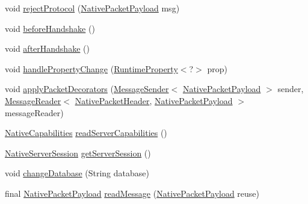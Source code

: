 \begin{DoxyCompactItemize}
\item 
void \mbox{\hyperlink{classcom_1_1mysql_1_1cj_1_1protocol_1_1a_1_1_native_protocol_a8283407fa3022adc16c70f9c62e8d9ca}{reject\+Protocol}} (\mbox{\hyperlink{classcom_1_1mysql_1_1cj_1_1protocol_1_1a_1_1_native_packet_payload}{Native\+Packet\+Payload}} msg)
\item 
void \mbox{\hyperlink{classcom_1_1mysql_1_1cj_1_1protocol_1_1a_1_1_native_protocol_a30895f4669b803d40bfc8dd8d3f1dd32}{before\+Handshake}} ()
\item 
void \mbox{\hyperlink{classcom_1_1mysql_1_1cj_1_1protocol_1_1a_1_1_native_protocol_a085d0d9db853b6e0ba5a88f52e19a3ed}{after\+Handshake}} ()
\item 
void \mbox{\hyperlink{classcom_1_1mysql_1_1cj_1_1protocol_1_1a_1_1_native_protocol_a8ca553b8932948c32622bb09d58df2f5}{handle\+Property\+Change}} (\mbox{\hyperlink{interfacecom_1_1mysql_1_1cj_1_1conf_1_1_runtime_property}{Runtime\+Property}}$<$?$>$ prop)
\item 
void \mbox{\hyperlink{classcom_1_1mysql_1_1cj_1_1protocol_1_1a_1_1_native_protocol_aebf9cad7c22da41d696066a75e768eed}{apply\+Packet\+Decorators}} (\mbox{\hyperlink{interfacecom_1_1mysql_1_1cj_1_1protocol_1_1_message_sender}{Message\+Sender}}$<$ \mbox{\hyperlink{classcom_1_1mysql_1_1cj_1_1protocol_1_1a_1_1_native_packet_payload}{Native\+Packet\+Payload}} $>$ sender, \mbox{\hyperlink{interfacecom_1_1mysql_1_1cj_1_1protocol_1_1_message_reader}{Message\+Reader}}$<$ \mbox{\hyperlink{classcom_1_1mysql_1_1cj_1_1protocol_1_1a_1_1_native_packet_header}{Native\+Packet\+Header}}, \mbox{\hyperlink{classcom_1_1mysql_1_1cj_1_1protocol_1_1a_1_1_native_packet_payload}{Native\+Packet\+Payload}} $>$ message\+Reader)
\item 
\mbox{\hyperlink{classcom_1_1mysql_1_1cj_1_1protocol_1_1a_1_1_native_capabilities}{Native\+Capabilities}} \mbox{\hyperlink{classcom_1_1mysql_1_1cj_1_1protocol_1_1a_1_1_native_protocol_acfce17a81631146efc0ca8d9cef22880}{read\+Server\+Capabilities}} ()
\item 
\mbox{\hyperlink{classcom_1_1mysql_1_1cj_1_1protocol_1_1a_1_1_native_server_session}{Native\+Server\+Session}} \mbox{\hyperlink{classcom_1_1mysql_1_1cj_1_1protocol_1_1a_1_1_native_protocol_a160dda876f487328e007c9c96b155c6b}{get\+Server\+Session}} ()
\item 
void \mbox{\hyperlink{classcom_1_1mysql_1_1cj_1_1protocol_1_1a_1_1_native_protocol_a565743e2d31afb5137925eb2c372d344}{change\+Database}} (String database)
\item 
final \mbox{\hyperlink{classcom_1_1mysql_1_1cj_1_1protocol_1_1a_1_1_native_packet_payload}{Native\+Packet\+Payload}} \mbox{\hyperlink{classcom_1_1mysql_1_1cj_1_1protocol_1_1a_1_1_native_protocol_a3729eaeefbb45e1742184e1902ed708b}{read\+Message}} (\mbox{\hyperlink{classcom_1_1mysql_1_1cj_1_1protocol_1_1a_1_1_native_packet_payload}{Native\+Packet\+Payload}} reuse)

\end{DoxyCompactItemize}

